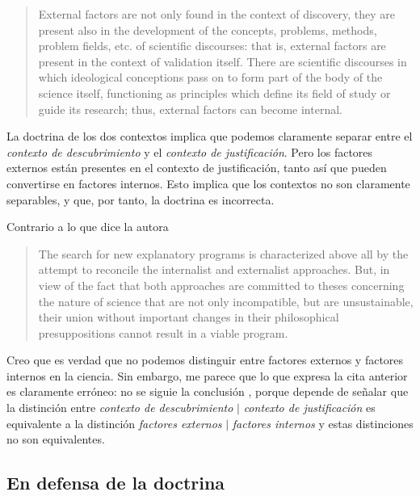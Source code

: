 \begin{quote}

	External factors are not only found in the context of discovery, they
	are present also in the development of the concepts, problems, methods,
	problem fields, etc. of scientific discourses: that is, external
	factors are present in the context of validation itself. There are
	scientific discourses in which ideological conceptions pass on to form
	part of the body of the science itself, functioning as principles which
	define its field of study or guide its research; thus, external factors
	can become internal.

\end{quote}

La doctrina de los dos contextos implica que podemos claramente separar
entre el \emph{contexto de descubrimiento} y el \emph{contexto de
justificación}. Pero los factores externos están presentes en el contexto
de justificación, tanto así que pueden convertirse en factores internos.
Esto implica que los contextos no son claramente separables, y que, por
tanto, la doctrina es incorrecta.

Contrario a lo que dice la autora

\begin{quote} The search for new explanatory programs is characterized
above all by the attempt to reconcile the internalist and externalist
approaches. But, in view of the fact that both approaches are committed to
theses concerning the nature of science that are not only incompatible, but
are unsustainable, their union without important changes in their
philosophical presuppositions cannot result in a viable program.
\parencite[p. 79]{Yturbe1995} \end{quote}

Creo que es verdad que no podemos distinguir entre factores externos y
factores internos en la ciencia. Sin embargo, me parece que lo que expresa
la cita anterior es claramente erróneo: no se siguie la conclusión , porque depende de señalar que la
distinción entre \emph{contexto de descubrimiento} $|$ \emph{contexto de
justificación} es equivalente a la distinción \emph{factores externos} $|$
\emph{factores internos} y estas distinciones no son equivalentes.



\subsection{En defensa de la doctrina}

